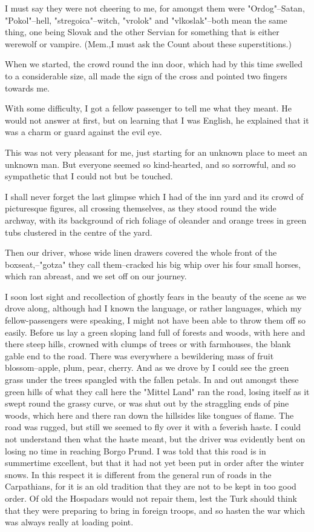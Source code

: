 I must say they were not cheering to me, for amongst them were "Ordog"--Satan, "Pokol"--hell, "stregoica"--witch, "vrolok" and "vlkoslak"--both mean the same thing, one being Slovak and the other Servian for something that is either werewolf or vampire. (Mem.,I must ask the Count about these superstitions.) 

When we started, the crowd round the inn door, which had by this time swelled to a considerable size, all made the sign of the cross and pointed two fingers towards me. 

With some difficulty, I got a fellow passenger to tell me what they meant. He would not answer at first, but on learning that I was English, he explained that it was a charm or guard against the evil eye. 

This was not very pleasant for me, just starting for an unknown place to meet an unknown man. But everyone seemed so kind-hearted, and so sorrowful, and so sympathetic that I could not but be touched. 

I shall never forget the last glimpse which I had of the inn yard and its crowd of picturesque figures, all crossing themselves, as they stood round the wide archway, with its background of rich foliage of oleander and orange trees in green tubs clustered in the centre of the yard. 

Then our driver, whose wide linen drawers covered the whole front of the boxseat,--"gotza" they call them--cracked his big whip over his four small horses, which ran abreast, and we set off on our journey. 

I soon lost sight and recollection of ghostly fears in the beauty of the scene as we drove along, although had I known the language, or rather languages, which my fellow-passengers were speaking, I might not have been able to throw them off so easily. Before us lay a green sloping land full of forests and woods, with here and there steep hills, crowned with clumps of trees or with farmhouses, the blank gable end to the road. There was everywhere a bewildering mass of fruit blossom--apple, plum, pear, cherry. And as we drove by I could see the green grass under the trees spangled with the fallen petals. In and out amongst these green hills of what they call here the "Mittel Land" ran the road, losing itself as it swept round the grassy curve, or was shut out by the straggling ends of pine woods, which here and there ran down the hillsides like tongues of flame. The road was rugged, but still we seemed to fly over it with a feverish haste. I could not understand then what the haste meant, but the driver was evidently bent on losing no time in reaching Borgo Prund. I was told that this road is in summertime excellent, but that it had not yet been put in order after the winter snows. In this respect it is different from the general run of roads in the Carpathians, for it is an old tradition that they are not to be kept in too good order. Of old the Hospadars would not repair them, lest the Turk should think that they were preparing to bring in foreign troops, and so hasten the war which was always really at loading point. 

